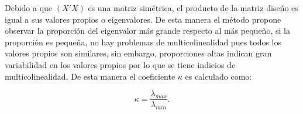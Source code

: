 \documentclass[a4paper,oneside,openany]{book}
\begin{document}
Debido a que \((X'X)\) es una matriz simétrica, el producto de la matriz
diseño es igual a sus valores propios o eigenvalores. De esta manera el
método propone observar la proporción del eigenvalor más grande respecto
al más pequeño, si la proporción es pequeña, no hay problemas de
multicolinealidad pues todos los valores propios son similares, sin
embargo, proporciones altas indican gran variabilidad en los valores
propios por lo que se tiene indicios de multicolinealidad. De esta
manera el coeficiente \(\kappa\) es calculado como:

\[\kappa=\frac{\lambda_{max}}{\lambda_{min}}.\]


\end{document}
